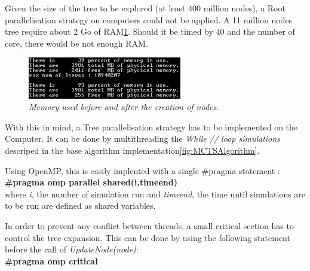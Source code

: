 Given the size of the tree to be explored (at least 400 million nodes), a Root parallelisation strategy on computers could not be applied. A 11 million nodes tree require about 2 Go of RAM\ref{fig:RAMTree}. Should it be timed by 40 and the number of core, there would be not enough RAM.
\begin{figure}[H]
\centerline{\includegraphics[width=0.6\textwidth]{Parallelisation/Computer/Img/RAM.png}}
\caption{\label{fig:RAMTree}\textit{Memory used before and after the creation of nodes}.}
\end{figure}

With this in mind, a Tree parallelisation strategy has to be implemented on the Computer. It can be done by multithreading the \textit{While // loop simulations} descriped in the base algorithm implementation\ref{fig:MCTSAlgorithm}.

Using OpenMP, this is easily implented with a single \#pragma statement :\\
\textbf{\#pragma omp parallel shared(i,timeend)}\\
where \textit{i}, the number of simulation run and \textit{timeend}, the time until simulations are to be run are defined as shared variables.

In order to prevent any conflict between threads, a small critical section has to control the tree expansion. This can be done by using the following statement before the call of \textit{UpdateNode(node)}:\\
\textbf{\#pragma omp critical}